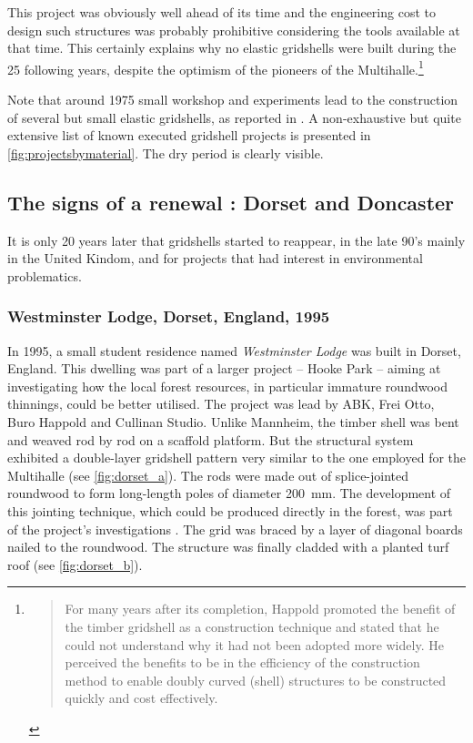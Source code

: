 This project was obviously well ahead of its time and the engineering cost to design such structures was probably prohibitive considering the tools available at that time. This certainly explains why no elastic gridshells were built during the 25 following years, despite the optimism of the pioneers of the Multihalle.\footnote{\blockcquote[]{Harris2003}{For many years after its completion, Happold promoted the benefit of the timber gridshell as a construction technique and stated that he could not understand why it had not been adopted more widely. He perceived the benefits to be in the efficiency of the construction method to enable doubly curved (shell) structures to be constructed quickly and cost effectively.}.}

Note that around 1975 small workshop and experiments lead to the construction of several but small elastic gridshells, as reported in \cite{IL10}. A non-exhaustive but quite extensive list of known executed gridshell projects is presented in \cref{fig:projectsbymaterial}. The dry period is clearly visible.

\subsection{The signs of a renewal : Dorset and Doncaster}\label{sec=signs}

It is only 20 years later that gridshells started to reappear, in the late 90's mainly in the United Kindom, and for projects that had interest in environmental problematics.

\subsubsection{Westminster Lodge, Dorset, England, 1995}
In 1995, a small student residence named \emph{Westminster Lodge} was built in Dorset, England. This dwelling was part of a larger project -- Hooke Park -- aiming at investigating how the local forest resources, in particular immature roundwood thinnings, could be better utilised. The project was lead by ABK, Frei Otto, Buro Happold and Cullinan Studio. Unlike Mannheim, the timber shell was bent and weaved rod by rod on a scaffold platform. But the structural system exhibited a double-layer gridshell pattern very similar to the one employed for the Multihalle (see \cref{fig:dorset_a}). The rods were made out of splice-jointed roundwood to form long-length poles of diameter \SI{200}{mm}. The development of this jointing technique, which could be produced directly in the forest, was part of the project's investigations \cite{Burton1998}. The grid was braced by a layer of diagonal boards nailed to the roundwood. The structure was finally cladded with a planted turf roof (see \cref{fig:dorset_b}).

